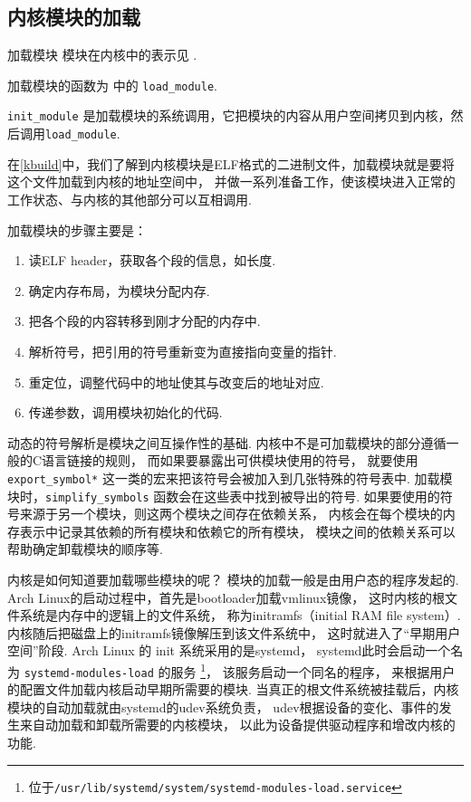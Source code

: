 \subsection{内核模块的加载}

\begin{readsrcbox}{加载模块}
	模块在内核中的表示见 .

	加载模块的函数为  中的 \lstinline{load_module}.

	\lstinline{init_module} 是加载模块的系统调用，它把模块的内容从用户空间拷贝到内核，然后调用\lstinline{load_module}.
\end{readsrcbox}

在\ref{kbuild}中，我们了解到内核模块是ELF格式的二进制文件，加载模块就是要将这个文件加载到内核的地址空间中，
并做一系列准备工作，使该模块进入正常的工作状态、与内核的其他部分可以互相调用.

加载模块的步骤主要是：
\begin{enumerate}
	\item 读ELF header，获取各个段的信息，如长度.
	\item 确定内存布局，为模块分配内存.
	\item 把各个段的内容转移到刚才分配的内存中.
	\item 解析符号，把引用的符号重新变为直接指向变量的指针.
	\item 重定位，调整代码中的地址使其与改变后的地址对应.
	\item 传递参数，调用模块初始化的代码.
\end{enumerate}

动态的符号解析是模块之间互操作性的基础.
内核中不是可加载模块的部分遵循一般的C语言链接的规则，
而如果要暴露出可供模块使用的符号，
就要使用 \lstinline{export_symbol*} 这一类的宏来把该符号会被加入到几张特殊的符号表中. \cite{Unreliab5:online}
加载模块时，\lstinline{simplify_symbols} 函数会在这些表中找到被导出的符号.
如果要使用的符号来源于另一个模块，则这两个模块之间存在依赖关系，
内核会在每个模块的内存表示中记录其依赖的所有模块和依赖它的所有模块，
模块之间的依赖关系可以帮助确定卸载模块的顺序等.

内核是如何知道要加载哪些模块的呢？
模块的加载一般是由用户态的程序发起的.
Arch Linux的启动过程\cite{archboot:online}中，首先是bootloader加载vmlinux镜像，
这时内核的根文件系统是内存中的逻辑上的文件系统，
称为initramfs（initial RAM file system）.
内核随后把磁盘上的initramfs镜像解压到该文件系统中，
这时就进入了“早期用户空间”阶段.
Arch Linux 的 init 系统采用的是systemd，
systemd此时会启动一个名为 \lstinline{systemd-modules-load} 的服务
\footnote{位于\lstinline{/usr/lib/systemd/system/systemd-modules-load.service}}，
该服务启动一个同名的程序，
来根据用户的配置文件加载内核启动早期所需要的模块.
当真正的根文件系统被挂载后，内核模块的自动加载就由systemd的udev系统负责，
udev根据设备的变化、事件的发生来自动加载和卸载所需要的内核模块，
以此为设备提供驱动程序和增改内核的功能.

